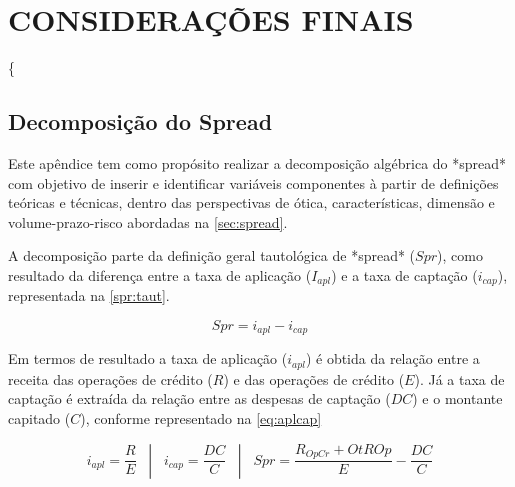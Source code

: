 \documentclass[
  12pt,
  12pt,
  openright,
  oneside,
  a4paper,
  chapter=TITLE,
  section=TITLE,
  subsection=TITLE,
  subsubsection=TITLE,
  english,
  portugues,
  sumario=tradicional]{abntex2}
\begin{document}

\chapter*[Conclusão]{CONSIDERAÇÕES FINAIS}

\postextual

\postextual



\{

\begin{apendicesenv}

\vspace{-10mm}

\renewcommand{\thechapter}{\arabic{chapter}}

\chapter{Decomposição do Spread}\label{apendicea}

Este apêndice tem como propósito realizar a decomposição algébrica do *spread* com objetivo de inserir e identificar variáveis componentes à partir de definições teóricas e técnicas, dentro das perspectivas de ótica, características, dimensão e volume-prazo-risco abordadas na \autoref{sec:spread}.

A decomposição parte da definição geral tautológica de *spread* ($Spr$), como resultado da diferença entre a taxa de aplicação ($I_{apl}$) e a taxa de captação ($i_{cap}$), representada na \autoref{spr:taut}.


\begin{equation}\label{spr:taut}
Spr = i_{apl} - i_{cap} 
\end{equation}


Em termos de resultado a taxa de aplicação ($i_{apl}$) é obtida da relação entre a receita das operações de crédito ($R$) e das operações de crédito ($E$). Já a taxa de captação é extraída da relação entre as despesas de captação ($DC$) e o montante capitado ($C$), conforme representado na \autoref{eq:aplcap}


\begin{equation}\label{eq:aplcap}
i_{apl} = \frac{R}{E}  \hspace{10pt} |  \hspace{10pt} i_{cap} =  \frac{DC}{C}  \hspace{10pt} |  \hspace{10pt} Spr =  \frac{R_{OpCr} + OtROp}{E} -  \frac{DC}{C}
\end{equation}



\end{apendicesenv}
\end{document}
